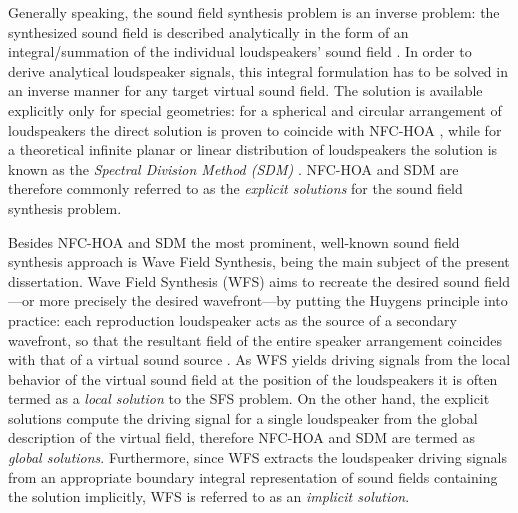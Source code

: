 Generally speaking, the sound field synthesis problem is an inverse problem: the synthesized sound field is described analytically in the form of an integral/summation of the individual loudspeakers' sound field \cite{fazi2008surround, Fazi2010, Ahrens2010phd, Ahrens2012}.
In order to derive analytical loudspeaker signals, this integral formulation has to be solved in an inverse manner for any target virtual sound field.
The solution is available explicitly only for special geometries: for a spherical and circular arrangement of loudspeakers the direct solution is proven to coincide with NFC-HOA \cite{943347, Daniel2003, poletti2005three, fazi2008surround, Ahrens2008:Analytical_Circ_Spherical_SFS, Fazi2010, Ahrens2011:icassp}, while for a theoretical infinite planar or linear distribution of loudspeakers the solution is known as the \emph{Spectral Division Method (SDM)} \cite{Fazi2010, Ahrens2010a, Ahrens2012:Ambisonics_for_planar_linear, Ahrens2012}.
NFC-HOA and SDM are therefore commonly referred to as the \emph{explicit solutions} for the sound field synthesis problem.

Besides NFC-HOA and SDM the most prominent, well-known sound field synthesis approach is Wave Field Synthesis, being the main subject of the present dissertation.
Wave Field Synthesis (WFS) aims to recreate the desired sound field---or more precisely the desired wavefront---by putting the Huygens principle into practice: 
each reproduction loudspeaker acts as the source of a secondary wavefront, so that the resultant field of the entire speaker arrangement coincides with that of a virtual sound source \cite{Berkhout1993:Acoustic_control_by_WFS, Verheijen1997:phd, Ahrens2012}.
As WFS yields driving signals from the local behavior of the virtual sound field at the position of the loudspeakers it is often termed as a \emph{local solution} to the SFS problem.
On the other hand, the explicit solutions compute the driving signal for a single loudspeaker from the global description of the virtual field, therefore NFC-HOA and SDM are termed as \emph{global solutions}.
Furthermore, since WFS extracts the loudspeaker driving signals from an appropriate boundary integral representation of sound fields containing the solution implicitly, WFS is referred to as an \emph{implicit solution}.

